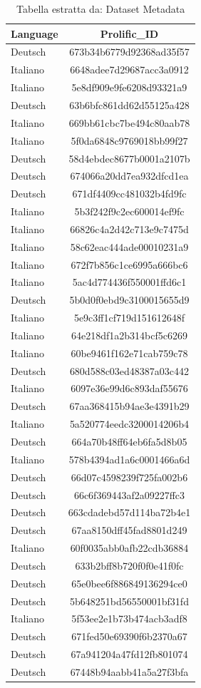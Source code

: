 \begin{table}[htbp]
\caption{Tabella estratta da: Dataset Metadata}
\label{tab:dataset_metadata}
\begin{tabular}{lc}
\toprule
Language & Prolific\_ID \\
\midrule
Deutsch & 673b34b6779d92368ad35f57 \\
Italiano & 6648adee7d29687acc3a0912 \\
Italiano & 5e8df909e9fe6208d93321a9 \\
Deutsch & 63b6bfc861dd62d55125a428 \\
Italiano & 669bb61cbc7be494c80aab78 \\
Italiano & 5f0da6848c9769018bb99f27 \\
Deutsch & 58d4ebdec8677b0001a2107b \\
Deutsch & 674066a20dd7ea932dfcd1ea \\
Deutsch & 671df4409cc481032b4fd9fc \\
Italiano & 5b3f242f9c2ec600014ef9fc \\
Italiano & 66826c4a2d42c713e9c7475d \\
Italiano & 58c62eac444ade00010231a9 \\
Italiano & 672f7b856c1ce6995a666bc6 \\
Italiano & 5ac4d774436f550001ffd6c1 \\
Deutsch & 5b0d0f0ebd9c3100015655d9 \\
Italiano & 5e9c3ff1cf719d151612648f \\
Italiano & 64e218df1a2b314bcf5c6269 \\
Italiano & 60be9461f162e71cab759c78 \\
Deutsch & 680d588c03ed48387a03c442 \\
Italiano & 6097e36e99d6c893daf55676 \\
Deutsch & 67aa368415b94ae3e4391b29 \\
Italiano & 5a520774eedc3200014206b4 \\
Deutsch & 664a70b48ff64eb6fa5d8b05 \\
Italiano & 578b4394ad1a6c0001466a6d \\
Deutsch & 66d07c4598239f725fa002b6 \\
Deutsch & 66c6f369443af2a09227ffc3 \\
Deutsch & 663cdadebd57d114ba72b4e1 \\
Deutsch & 67aa8150dff45fad8801d249 \\
Italiano & 60f0035abb0afb22cdb36884 \\
Deutsch & 633b2bff8b720f0f0e41f0fc \\
Deutsch & 65e0bee6f886849136294ce0 \\
Deutsch & 5b648251bd56550001bf31fd \\
Italiano & 5f53ee2e1b73b474acb3adf8 \\
Deutsch & 671fed50e69390f6b2370a67 \\
Deutsch & 67a941204a47fd12fb801074 \\
Deutsch & 67448b94aabb41a5a27f3bfa \\
\bottomrule
\end{tabular}
\end{table}
